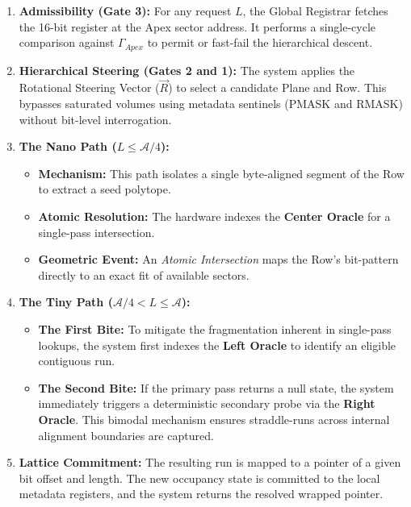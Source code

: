\documentclass[11pt]{article}
\begin{document}
\begin{enumerate}
    \item \textbf{Admissibility (Gate 3):} For any request $L$, the Global Registrar fetches the 16-bit register at the Apex sector address. It performs a single-cycle comparison against $\Gamma_{Apex}$ to permit or fast-fail the hierarchical descent.
    
    \item \textbf{Hierarchical Steering (Gates 2 and 1):} The system applies the Rotational Steering Vector ($\vec{R}$) to select a candidate Plane and Row. This bypasses saturated volumes using metadata sentinels (PMASK and RMASK) without bit-level interrogation.

    \item \textbf{The Nano Path ($L \le \mathcal{A}/4$):}
    \begin{itemize}
        \item \textbf{Mechanism:} This path isolates a single byte-aligned segment of the Row to extract a seed polytope.
        \item \textbf{Atomic Resolution:} The hardware indexes the \textbf{Center Oracle} for a single-pass intersection.
        \item \textbf{Geometric Event:} An \textit{Atomic Intersection} maps the Row's bit-pattern directly to an exact fit of available sectors.
    \end{itemize}

    \item \textbf{The Tiny Path ($\mathcal{A}/4 < L \le \mathcal{A}$):}
    \begin{itemize}
        \item \textbf{The First Bite:} To mitigate the fragmentation inherent in single-pass lookups, the system first indexes the \textbf{Left Oracle} to identify an eligible contiguous run.
        \item \textbf{The Second Bite:} If the primary pass returns a null state, the system immediately triggers a deterministic secondary probe via the \textbf{Right Oracle}. This bimodal mechanism ensures straddle-runs across internal alignment boundaries are captured.
    \end{itemize}
    
    \item \textbf{Lattice Commitment:} The resulting run is mapped to a pointer of a given bit offset and length. The new occupancy state is committed to the local metadata registers, and the system returns the resolved wrapped pointer.
\end{enumerate}
\end{document}
